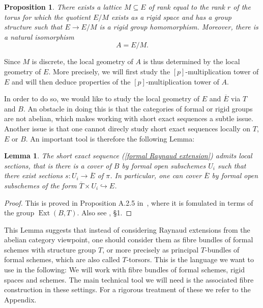 \documentclass[10pt,oneside]{amsart}
\newtheorem{lemma}[theorem]{Lemma}
\newtheorem{proposition}[theorem]{Proposition}
\theoremstyle{definition}
\begin{document}
	\begin{proposition}\label{Raynaud uniformisation}
		There exists a lattice $M \subseteq E$ of rank equal to the rank $r$ of the torus for which the quotient $E/M$ exists as a rigid space and has a group structure such that $E\rightarrow E/M$ is a rigid group homomorphism. Moreover, there is a natural isomorphism
		\[A=E/M.\]
	\end{proposition}
	
	Since $M$ is discrete, the local geometry of $A$ is thus determined by the local geometry of $E$. More precisely, we will first study the $[p]$-multiplication tower of $E$ and will then deduce properties of the $[p]$-multiplication tower of $A$.
	
	In order to do so, we would like to study the local geometry of $E$ and $\overline{E}$ via $T$ and $B$. An obstacle in doing this is that the categories of formal or rigid groups are not abelian, which makes working with short exact sequences a subtle issue. Another issue is that one cannot direcly study short exact sequences locally on $T$, $E$ or $B$. An important tool is therefore the following Lemma:

	\begin{lemma}\label{formal Raynaud sequence is locally split}
		The short exact sequence (\ref{formal Raynaud extension}) admits local sections, that is there is a cover of $B$ by formal open subschemes $U_i$ such that there exist sections $s:U_i\rightarrow \overline{E}$ of $\pi$. In particular, one can cover $\overline{E}$ by formal open subschemes of the form $\overline{T}\times U_i\hookrightarrow E$.
	\end{lemma}
	\begin{proof}
		This is proved in Proposition A.2.5 in~\cite{rigid geometry of curves}, where it is fomulated in terms of the group $\operatorname{Ext}(B,T)$. Also see \cite{BL}, \S 1.
	\end{proof}
	
	This Lemma suggests that instead of considering Raynaud extensions from the abelian category viewpoint, one should consider them as fibre bundles of formal schemes with structure group $T$, or more precisely as principal $T$-bundles of formal schemes, which are also called $T$-torsors. This is the language we want to use in the following: We will work with fibre bundles of formal schemes, rigid spaces and schemes. The main technical tool we will need is the associated fibre construction in these settings. For a rigorous  treatment of these we refer to the Appendix.
	
\end{document}
